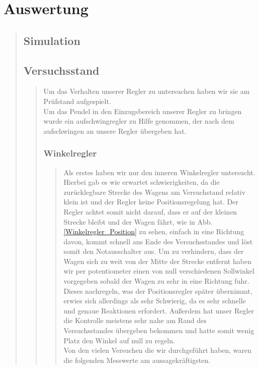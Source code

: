 \section{Auswertung}
\begin{quote}
    
    \subsection{Simulation}
    \begin{quote}
        
    \end{quote}%
    
    
    
    
    
    \subsection{Versuchsstand}
    \begin{quote}
        
        Um das Verhalten unserer Regler zu untersuchen haben wir sie am Prüfstand aufgespielt.\\
        Um das Pendel in den Einzugsbereich unserer Regler zu bringen wurde ein aufschwingregler zu Hilfe genommen, der nach
        dem aufschwingen an unsere Regler übergeben hat.
        
        \subsubsection{Winkelregler}
        \begin{quote}
            
            Als erstes haben wir nur den inneren Winkelregler untersucht. Hierbei gab es wie erwartet schwierigkeiten, da
            die zurücklegbare Strecke des Wagens am Versuchstand relativ klein ist und der Regler keine Positionsregelung
            hat. Der Regler achtet somit nicht darauf, dass er auf der kleinen Strecke bleibt und der Wagen fährt, wie in
            Abb. \ref{Winkelregler_Position} zu sehen, einfach in eine Richtung davon, kommt schnell ans Ende
            des Versuchsstandes und löst somit den Notausschalter aus. Um zu verhindern, dass der Wagen sich zu weit von der
            Mitte der Strecke entfernt haben wir per potentiometer einen von null verschiedenen Sollwinkel vorgegeben sobald der Wagen
            zu sehr in eine Richtung fuhr.
            Dieses nachregeln, was der Positionsregler später übernimmt, erwies sich allerdings als sehr Schwierig, da es
            sehr schnelle und genaue Reaktionen erfordert. Außerdem hat unser Regler die Kontrolle meistens sehr nahe am
            Rand des Versuchsstandes übergeben bekommen und hatte somit wenig Platz den Winkel auf null zu regeln.\\
            Von den vielen Versuchen die wir durchgeführt haben, waren die folgenden Messwerte am aussagekräftigsten.
            \\
            

\end{quote}
\end{quote}
\end{quote}
